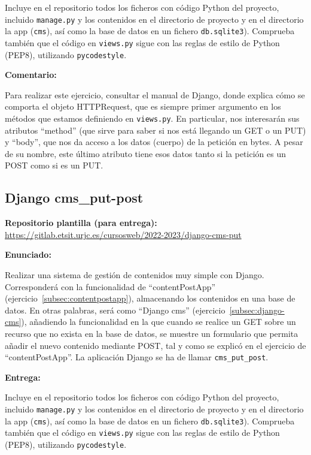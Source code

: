 Incluye en el repositorio todos los ficheros con código Python del proyecto, incluido \texttt{manage.py} y los contenidos en el directorio de proyecto y en el directorio la app (\texttt{cms}), así como la base de datos en un fichero \texttt{db.sqlite3}). Comprueba también que el código en \texttt{views.py} sigue con las reglas de estilo de Python (PEP8), utilizando \texttt{pycodestyle}.


\textbf{Comentario:}

Para realizar este ejercicio, consultar el manual de Django, donde explica cómo se comporta el objeto HTTPRequest, que es siempre primer argumento en los métodos que estamos definiendo en \texttt{views.py}. En particular, nos interesarán sus atributos ``method'' (que sirve para saber si nos está llegando un GET o un PUT) y ``body'', que nos da acceso a los datos (cuerpo) de la petición en bytes. A pesar de su nombre, este último atributo tiene esos datos tanto si la petición es un POST como si es un PUT. 

\subsection{Django cms\_put-post}
\label{subsec:django-cms-put-post}

\textbf{Repositorio plantilla (para entrega):} \\
\url{https://gitlab.etsit.urjc.es/cursosweb/2022-2023/django-cms-put}

\textbf{Enunciado:}

Realizar una sistema de gestión de contenidos muy simple con Django. Corresponderá con la funcionalidad de ``contentPostApp'' (ejercicio~\ref{subsec:contentpostapp}), almacenando los contenidos en una base de datos. En otras palabras, será como ``Django cms'' (ejercicio~\ref{subsec:django-cms}), añadiendo la funcionalidad en la que cuando se realice un GET sobre un recurso que no exista en la base de datos, se muestre un formulario que permita añadir el nuevo contenido mediante POST, tal y como se explicó en el ejercicio de ``contentPostApp''. La aplicación Django se ha de llamar \texttt{cms\_put\_post}.

\textbf{Entrega:}

Incluye en el repositorio todos los ficheros con código Python del proyecto, incluido \texttt{manage.py} y los contenidos en el directorio de proyecto y en el directorio la app (\texttt{cms}), así como la base de datos en un fichero \texttt{db.sqlite3}). Comprueba también que el código en \texttt{views.py} sigue con las reglas de estilo de Python (PEP8), utilizando \texttt{pycodestyle}.


